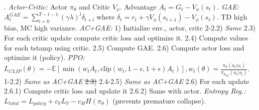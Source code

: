 
. \emph{Actor-Critic:} Actor $\pi_\theta$ and Critic $V_\phi$. Advantage $A_t = G_t - V_\phi(s_t)$. \emph{GAE:} $A^{GAE}_t = \sum_{l=0}^{T-t-1} (\gamma \lambda)^l \delta_{t+l}$ where $\delta_t = r_t + \gamma V_\phi(s_{t+1}) - V_\phi(s_t)$. TD high bias, MC high variance. \emph{AC+GAE:} 1) Initialize env., actor, critc 2-2.2) \textit{Same} 2.3) For each critic update compute critic loss and optimize it. 2.4) Compute values for each tstamp using critic. 2.5) Compute GAE. 2.6) Compute actor loss and optimize it (policy). 
\emph{PPO:} $L_{CLIP}(\theta) = -\mathbb{E} [ \min(w_t A_t, \text{clip}(w_t, 1-\epsilon, 1+\epsilon) A_t) ], w_t(\theta) = \frac{\pi_\theta(a_t|s_t)}{\pi_{\theta_{old}}(a_t|s_t)}$. 1-2.2) \textit{Same as AC+GAE} \sout{2.3)} 2.4-2.5) \textit{Same as AC+GAE} 2.6) For each update 2.6.1) Compute critic loss and update it 2.6.2) Same with actor. \emph{Entropy Reg.:} $L_{total} = L_{policy} + c_V L_V - c_H H(\pi_\theta)$ (prevents premature collapse).


